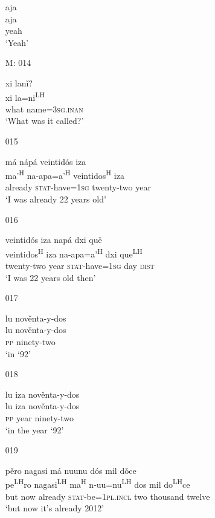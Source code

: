 \begin{itemize}
\glll aja\\
aja\\
yeah \\
\glt `Yeah'
 

\item[M: 014]
   
xi lan\v{i}?\\
xi la=ni\textsuperscript{LH}\\
what name=\textsc{3sg.inan}\\
\glt `What was it called?'
 

\item[015]
   
\glll m\'{a} n\'{a}p\'{a} veintid\'{o}s iza\\
ma'\textsuperscript{H} na-apa=a'\textsuperscript{H} veintidos\textsuperscript{H} iza\\
already \textsc{stat}-have=\textsc{1sg} twenty-two year\\
\glt `I was already 22 years old'
 

\item[016]
   
\glll veintid\'{o}s iza nap\'{a} dxi qu\v{e}\\ 
veintidos\textsuperscript{H} iza na-apa=a'\textsuperscript{H} dxi que\textsuperscript{LH}\\
twenty-two year \textsc{stat}-have=\textsc{1sg} day \textsc{dist}\\
\glt `I was 22 years old then'
 

\item[017]
   
\glll lu nov\v{e}nta-y-dos\\
 lu nov\v{e}nta-y-dos\\
 \textsc{pp} ninety-two\\
\glt `in `92'
 

\item[018]
  
\glll  lu iza nov\v{e}nta-y-dos\\
lu iza nov\v{e}nta-y-dos\\
\textsc{pp} year ninety-two\\
\glt `in the year `92'
 

\item[019]
   
\glll p\v{e}ro nagasi m\'{a} nuunu d\'{o}s mil d\v{o}ce\\
pe\textsuperscript{LH}ro nagasi\textsuperscript{LH} ma\textsuperscript{H} n-uu=nu\textsuperscript{LH} dos mil do\textsuperscript{LH}ce\\
but now already \textsc{stat}-be=\textsc{1pl.incl} two thousand twelve\\
\glt `but now it's already 2012'
 


\end{itemize}
